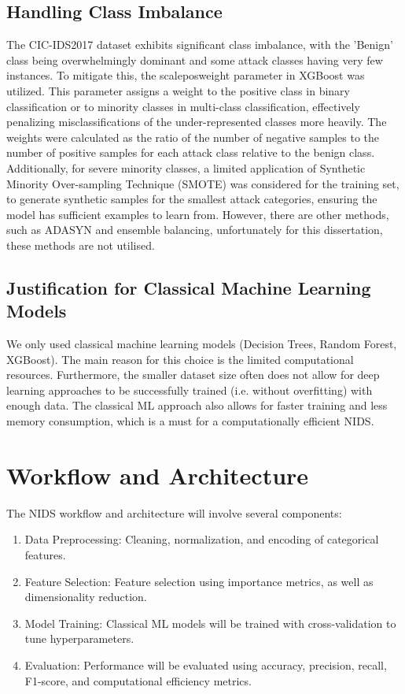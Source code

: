 \subsection{Handling Class Imbalance}
The CIC-IDS2017 dataset exhibits significant class imbalance, with the 'Benign' class being overwhelmingly dominant and some attack classes having very few instances. To mitigate this, the scale\textunderscore pos\textunderscore weight parameter in XGBoost was utilized. This parameter assigns a weight to the positive class in binary classification or to minority classes in multi-class classification, effectively penalizing misclassifications of the under-represented classes more heavily. The weights were calculated as the ratio of the number of negative samples to the number of positive samples for each attack class relative to the benign class. Additionally, for severe minority classes, a limited application of Synthetic Minority Over-sampling Technique (SMOTE) was considered for the training set, to generate synthetic samples for the smallest attack categories, ensuring the model has sufficient examples to learn from. However, there are other methods, such as ADASYN and ensemble balancing, unfortunately for this dissertation, these methods are not utilised.

\subsection{Justification for Classical Machine Learning Models} 
We only used classical machine learning models (Decision Trees, Random Forest, XGBoost). The main reason for this choice is the limited computational resources. Furthermore, the smaller dataset size often does not allow for deep learning approaches to be successfully trained (i.e. without overfitting) with enough data. The classical ML approach also allows for faster training and less memory consumption, which is a must for a computationally efficient NIDS.

\section{Workflow and Architecture} 
The NIDS workflow and architecture will involve several components:
\begin{enumerate} 
	\item Data Preprocessing: Cleaning, normalization, and encoding of categorical features. 
	\item Feature Selection: Feature selection using importance metrics, as well as dimensionality reduction.
	\item Model Training: Classical ML models will be trained with cross-validation to tune hyperparameters.
	\item Evaluation: Performance will be evaluated using accuracy, precision, recall, F1-score, and computational efficiency metrics.
\end{enumerate} 

